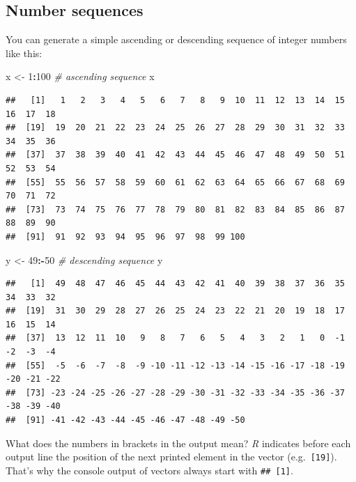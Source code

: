 \documentclass[
]{scrartcl}
\newenvironment{Shaded}{\begin{snugshade}}{\end{snugshade}}
\newcommand{\CommentTok}[1]{\textcolor[rgb]{0.56,0.35,0.01}{\textit{#1}}}
\newcommand{\DecValTok}[1]{\textcolor[rgb]{0.00,0.00,0.81}{#1}}
\newcommand{\NormalTok}[1]{#1}
\newcommand{\OtherTok}[1]{\textcolor[rgb]{0.56,0.35,0.01}{#1}}
\newcommand{\SpecialCharTok}[1]{\textcolor[rgb]{0.81,0.36,0.00}{\textbf{#1}}}
\begin{document}
\subsection{Number sequences}\label{number-sequences}

You can generate a simple ascending or descending sequence of integer numbers like this:

\begin{Shaded}
\begin{Highlighting}[]
\NormalTok{x }\OtherTok{\textless{}{-}} \DecValTok{1}\SpecialCharTok{:}\DecValTok{100}   \CommentTok{\# ascending sequence}
\NormalTok{x}
\end{Highlighting}
\end{Shaded}

\begin{verbatim}
##   [1]   1   2   3   4   5   6   7   8   9  10  11  12  13  14  15  16  17  18
##  [19]  19  20  21  22  23  24  25  26  27  28  29  30  31  32  33  34  35  36
##  [37]  37  38  39  40  41  42  43  44  45  46  47  48  49  50  51  52  53  54
##  [55]  55  56  57  58  59  60  61  62  63  64  65  66  67  68  69  70  71  72
##  [73]  73  74  75  76  77  78  79  80  81  82  83  84  85  86  87  88  89  90
##  [91]  91  92  93  94  95  96  97  98  99 100
\end{verbatim}

\begin{Shaded}
\begin{Highlighting}[]
\NormalTok{y }\OtherTok{\textless{}{-}} \DecValTok{49}\SpecialCharTok{:{-}}\DecValTok{50}  \CommentTok{\# descending sequence}
\NormalTok{y}
\end{Highlighting}
\end{Shaded}

\begin{verbatim}
##   [1]  49  48  47  46  45  44  43  42  41  40  39  38  37  36  35  34  33  32
##  [19]  31  30  29  28  27  26  25  24  23  22  21  20  19  18  17  16  15  14
##  [37]  13  12  11  10   9   8   7   6   5   4   3   2   1   0  -1  -2  -3  -4
##  [55]  -5  -6  -7  -8  -9 -10 -11 -12 -13 -14 -15 -16 -17 -18 -19 -20 -21 -22
##  [73] -23 -24 -25 -26 -27 -28 -29 -30 -31 -32 -33 -34 -35 -36 -37 -38 -39 -40
##  [91] -41 -42 -43 -44 -45 -46 -47 -48 -49 -50
\end{verbatim}

What does the numbers in brackets in the output mean? \emph{R} indicates before each output line the position of the next printed element in the vector (e.g.~\texttt{{[}19{]}}). That's why the console output of vectors always start with \texttt{\#\#\ {[}1{]}}.
\end{document}
